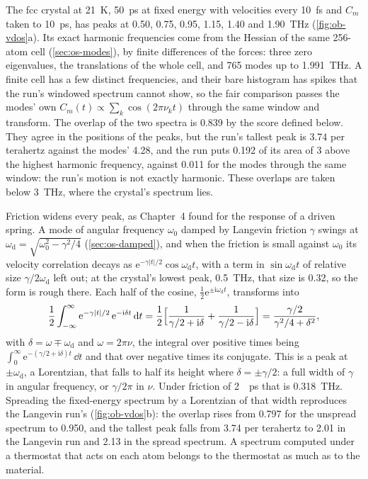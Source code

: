 The fcc crystal at \SI{21}{\kelvin}, \SI{50}{\pico\second} at fixed energy
with velocities every \SI{10}{\femto\second} and $C_m$ taken to
\SI{10}{\pico\second}, has peaks at 0.50, 0.75, 0.95, 1.15, 1.40 and
\SI{1.90}{\tera\hertz} (\cref{fig:ob-vdos}a). Its exact harmonic
frequencies come from the Hessian of the same 256-atom cell
(\cref{sec:os-modes}), by finite differences of the forces: three zero
eigenvalues, the translations of the whole cell, and 765 modes up to
\SI{1.991}{\tera\hertz}. A finite cell has a few distinct frequencies,
and their bare histogram has spikes that the run's windowed spectrum
cannot show, so the fair comparison passes the modes' own $C_m(t) \propto
\sum_k\cos(2\pi\nu_kt)$ through the same window and transform. The overlap
of the two spectra is 0.839 by the score defined below. They agree in
the positions of the peaks, but the run's tallest peak is 3.74 per
terahertz against the modes' 4.28, and the run puts 0.192 of its area of
3 above the highest harmonic frequency, against 0.011 for the modes
through the same window: the run's motion is not exactly harmonic. These
overlaps are taken below \SI{3}{\tera\hertz}, where the crystal's
spectrum lies.

Friction widens every peak, as Chapter~4 found for the response of a
driven spring. A mode
of angular frequency $\omega_0$ damped by Langevin friction $\gamma$ swings
at $\omega_{\mathrm d} = \sqrt{\omega_0^2 - \gamma^2/4}$ (\cref{sec:os-damped}),
and when the friction is small against $\omega_0$ its velocity correlation
decays as $\mathrm{e}^{-\gamma\lvert t\rvert/2}\cos\omega_{\mathrm d}t$, with a
term in $\sin\omega_{\mathrm d}t$ of relative size $\gamma/2\omega_{\mathrm d}$
left out; at the crystal's lowest peak, \SI{0.5}{\tera\hertz}, that size
is 0.32, so the form is rough there. Each half of the cosine,
$\frac12\mathrm{e}^{\pm\mathrm{i}\omega_{\mathrm d}t}$, transforms into
\begin{equation*}
   \frac12\int_{-\infty}^{\infty}\mathrm{e}^{-\gamma\lvert t\rvert/2}\,
   \mathrm{e}^{-\mathrm{i}\delta t}\,\mathrm{d} t
   = \frac12\Bigl[\frac{1}{\gamma/2 + \mathrm{i}\delta}
   + \frac{1}{\gamma/2 - \mathrm{i}\delta}\Bigr]
   = \frac{\gamma/2}{\gamma^2/4 + \delta^2} ,
\end{equation*}
with $\delta = \omega\mp\omega_{\mathrm d}$ and $\omega = 2\pi\nu$, the
integral over positive times being $\int_0^\infty\mathrm{e}^{-(\gamma/2 +
\mathrm{i}\delta)t}\,\dd t$ and that over negative times its conjugate.
This is a peak at $\pm\omega_{\mathrm d}$, a Lorentzian, that falls to
half its height where $\delta = \pm\gamma/2$: a full width of $\gamma$ in
angular frequency, or $\gamma/2\pi$ in $\nu$. Under friction of
\SI{2}{\per\pico\second} that is \SI{0.318}{\tera\hertz}. Spreading the
fixed-energy spectrum by a Lorentzian of that width reproduces the
Langevin run's (\cref{fig:ob-vdos}b): the overlap rises from 0.797 for
the unspread spectrum to 0.950, and the tallest peak falls from 3.74 per
terahertz to 2.01 in the Langevin run and 2.13 in the spread
spectrum. A spectrum computed
under a thermostat that acts on each atom belongs to the thermostat as
much as to the material.

